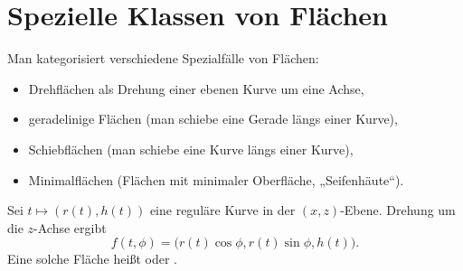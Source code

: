 \chapter{Spezielle Klassen von Flächen}



Man kategorisiert verschiedene Spezialfälle von Flächen:
\begin{itemize}
	\item
		Drehflächen als Drehung einer ebenen Kurve um eine Achse,
	\item
		geradelinige Flächen (man schiebe eine Gerade längs einer Kurve),
	\item
		Schiebflächen (man schiebe eine Kurve längs einer Kurve),
	\item
		Minimalflächen (Flächen mit minimaler Oberfläche, „Seifenhäute“).
\end{itemize}

\begin{df}[Drehfläche]
	Sei $t \mapsto (r(t), h(t))$ eine reguläre Kurve in der $(x,z)$-Ebene.
	Drehung um die $z$-Achse ergibt
	\[
		f(t, \phi) = \big( r(t) \cos \phi, r(t) \sin \phi, h(t) \big).
	\]
	Eine solche Fläche heißt  oder .
\end{df}

